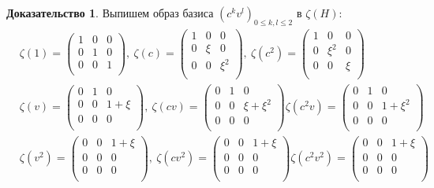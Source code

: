 \documentclass[a4paper, 12pt]{article}
\theoremstyle{definition}
\newtheorem*{prof}{\hspace*{\parindent}Доказательство}
\begin{document}
\begin{prof}
    Выпишем образ базиса $(c^kv^l)_{0 \leq k,l \leq 2}$ в $\zeta(H)$:
    \begin{eqnarray*}
    &\zeta(1) = \begin{pmatrix}
    1 & 0 & 0\\
    0 & 1 & 0\\
    0 & 0 & 1\\
    \end{pmatrix},\
    \zeta(c) = \begin{pmatrix}
    1 & 0 & 0\\
    0 & \xi & 0\\
    0 & 0 & \xi^2\\
    \end{pmatrix},\
    \zeta(c^2) = \begin{pmatrix}
    1 & 0 & 0\\
    0 & \xi^2 & 0\\
    0 & 0 & \xi\\
    \end{pmatrix}\\
    &\zeta(v) = \begin{pmatrix}
    0 & 1 & 0\\
    0 & 0 & 1+\xi\\
    0 & 0 & 0\\
    \end{pmatrix},\
    \zeta(cv) = \begin{pmatrix}
    0 & 1 & 0\\
    0 & 0 & \xi+\xi^2\\
    0 & 0 & 0\\
    \end{pmatrix} 
    \zeta(c^2v) = \begin{pmatrix}
    0 & 1 & 0\\
    0 & 0 & 1+\xi^2\\
    0 & 0 & 0\\
    \end{pmatrix}\\
    &\zeta(v^2) = \begin{pmatrix}
    0 & 0 & 1+\xi\\
    0 & 0 & 0\\
    0 & 0 & 0\\
    \end{pmatrix},\
    \zeta(cv^2) = \begin{pmatrix}
    0 & 0 & 1+\xi\\
    0 & 0 & 0\\
    0 & 0 & 0\\
    \end{pmatrix} 
    \zeta(c^2v^2) = \begin{pmatrix}
    0 & 0 & 1+\xi\\
    0 & 0 & 0\\
    0 & 0 & 0\\
    \end{pmatrix}\\    
    \end{eqnarray*}


\end{prof}
\end{document}
